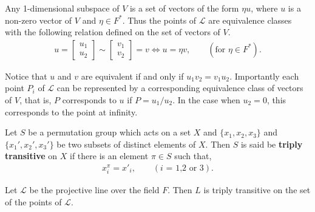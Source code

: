Any 1-dimensional subspace of $V$ is a set of vectors of the form $\eta u$, where $u$ is a non-zero vector of $V$ and $\eta \in F^*$. Thus the points of $\mathscr{L}$ are equivalence classes with the following relation defined on the set of vectors of $V$.
\begin{align*} u = \begin{bmatrix} u_1 \\ u_2 \end{bmatrix} \sim \begin{bmatrix} v_1 \\ v_2 \end{bmatrix} = v \iff u = \eta v, \qquad (\text{for $\eta \in F^*$}).
\end{align*}

Notice that $u$ and $v$ are equivalent if and only if $u_1 v_2 = v_1 u_2$. Importantly each point $P_i$ of $\mathscr{L}$ can be represented by a corresponding equivalence class of vectors of $V$, that is, $P$ corresponds to $u$ if $P = u_1 / u_2$. In the case when $u_2 = 0$, this corresponds to the point at infinity.

\begin{definition} Let $S$ be a permutation group which acts on a set $X$ and $\{ x_1, x_2, x_3 \}$ and $\{ x_1', x_2', x_3' \}$ be two subsets of distinct elements of $X$. Then $S$ is said be \textbf{triply transitive} on $X$ if there is an element $\pi \in S$ such that,
\begin{align*} x^{\pi}_i = x'_i, \qquad(\text{$i$ = 1,2 or 3}).
\end{align*} 
\end{definition}

\begin{theorem} \label{6.6}
Let $\mathscr{L}$ be the projective line over the field $F$. Then $L$ is triply transitive on the set of the points of $\mathscr{L}$. \vspace{3mm}
\end{theorem}

